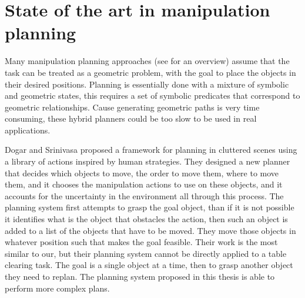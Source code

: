 \chapter{State of the art in manipulation planning}
\label{ch:state_of_the_art}

Many manipulation planning approaches (see \citep{PlanningAlgorithms} for an overview) assume that the task can be treated as a geometric problem, with the goal to place the objects in their desired positions. Planning is essentially done with a mixture of symbolic and geometric states, this
requires a set of symbolic predicates that correspond to geometric
relationships. Cause generating geometric paths is very time consuming, these hybrid planners could be too slow to be used in real applications.  



Dogar and Srinivasa \cite{Dogar2011} proposed a framework for planning in cluttered scenes using a library of actions inspired by human strategies. They designed a new planner that decides which
objects to move, the order to move them, where to move them, and it chooses the manipulation actions
to use on these objects, and it accounts for the uncertainty
in the environment all through this process. 
The planning system first attempts to grasp the goal object, than if it is not possible it identifies what is the object that obstacles the action, then such an object is added to a list of the objects that have to be moved. They move those objects in whatever position such that makes the goal feasible. 
Their work is the most similar to our, but their planning system cannot be directly applied to a table clearing task. The goal is a single object at a time, then to grasp another object they need to replan. The planning system proposed in this thesis is able to perform more complex plans.



